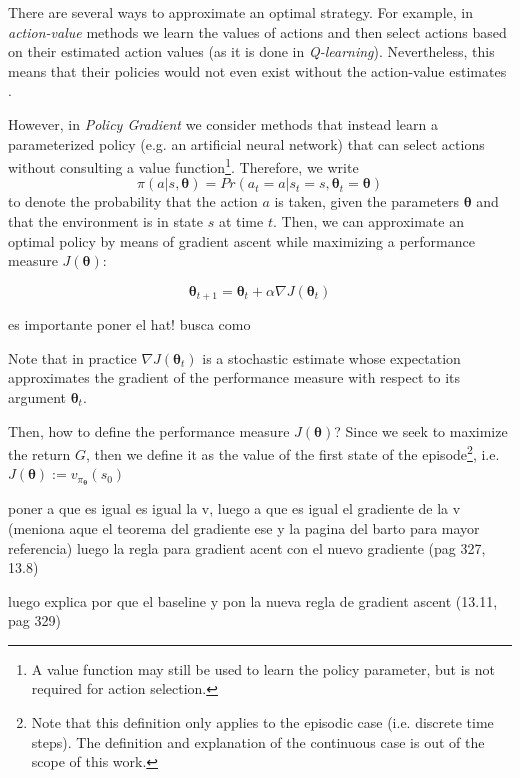 \documentclass[twoside,twocolumn]{article}
\begin{document}
There are several ways to approximate an optimal strategy. For example, in \emph{action-value} methods we learn the values of actions and then select
actions based on their estimated action values (as it is done in \textit{Q-learning}). Nevertheless, this means that their policies would not even exist without the action-value estimates \cite{Sutton1998}.

However, in \emph{Policy Gradient} we consider methods that instead learn a parameterized policy (e.g. an artificial neural network) that can select actions without consulting a value function\footnote{A value function may still be used to learn the policy parameter, but is not required for action selection.}.
Therefore, we write
$$\pi(a|s,\boldsymbol{\theta}) = Pr(a_t=a | s_t=s, \boldsymbol{\theta}_t=\boldsymbol{\theta})$$
 to denote the probability that the action $a$ is taken, given the parameters $\boldsymbol{\theta}$ and that the environment is in state $s$ at time $t$.
Then, we can approximate an optimal policy by means of gradient ascent while maximizing a performance measure $J(\boldsymbol{\theta})$:

\begin{equation}
  \boldsymbol{\theta}_{t+1} = \boldsymbol{\theta}_{t} + \alpha \nabla J(\boldsymbol{\theta}_t)
\end{equation}

es importante poner el hat! busca como

Note that in practice $\nabla J(\boldsymbol{\theta}_t)$ is a stochastic estimate whose expectation approximates the gradient of the performance measure with respect to its argument $\boldsymbol{\theta}_t$.

Then, how to define the performance measure $J(\boldsymbol{\theta})$? Since we seek to maximize the return $G$, then we define it as the value of the first state of the episode\footnote{Note that this definition only applies to the episodic case (i.e. discrete time steps). The definition and explanation of the continuous case is out of the scope of this work.}, i.e. $J(\boldsymbol{\theta}):=v_{\pi_{\boldsymbol{\theta}}}(s_0)$

poner a que es igual es igual la v, luego a que es igual el gradiente de la v (meniona aque el teorema del gradiente ese y la pagina del barto para mayor referencia)
luego la regla para gradient acent con el nuevo gradiente (pag 327, 13.8)

luego explica por que el baseline y pon la nueva regla de gradient ascent (13.11, pag 329)
\end{document}
